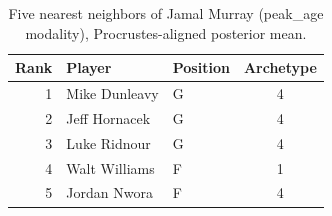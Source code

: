 \begin{table}[htbp]
  \centering\small
  \begin{tabular}{rllc}
    \toprule
    Rank & Player & Position & Archetype \\
    \midrule
    1 & Mike Dunleavy & G & 4 \\
    2 & Jeff Hornacek & G & 4 \\
    3 & Luke Ridnour & G & 4 \\
    4 & Walt Williams & F & 1 \\
    5 & Jordan Nwora & F & 4 \\
    \bottomrule
  \end{tabular}
  \caption{Five nearest neighbors of Jamal Murray (peak_age modality), Procrustes-aligned posterior mean.}
  \label{tab:Jamal_Murray_neighbors_peak_age}
\end{table}

